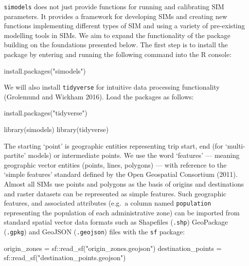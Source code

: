 \documentclass[11pt,letterpaper]{article}
\newenvironment{Shaded}{\begin{snugshade}}{\end{snugshade}}
\newcommand{\FunctionTok}[1]{\textcolor[rgb]{0.00,0.00,0.00}{#1}}
\newcommand{\NormalTok}[1]{#1}
\newcommand{\OtherTok}[1]{\textcolor[rgb]{0.56,0.35,0.01}{#1}}
\newcommand{\SpecialCharTok}[1]{\textcolor[rgb]{0.00,0.00,0.00}{#1}}
\newcommand{\StringTok}[1]{\textcolor[rgb]{0.31,0.60,0.02}{#1}}
\begin{document}
\texttt{simodels} does not just provide functions for running and calibrating SIM parameters.
It provides a framework for developing SIMs and creating new functions implementing different types of SIM and using a variety of pre-existing modelling tools in SIMs.
We aim to expand the functionality of the package building on the foundations presented below.
The first step is to install the package by entering and running the following command into the R console:

\begin{Shaded}
\begin{Highlighting}[]
\FunctionTok{install.packages}\NormalTok{(}\StringTok{"simodels"}\NormalTok{)}
\end{Highlighting}
\end{Shaded}

We will also install \texttt{tidyverse} for intuitive data processing functionality (Grolemund and Wickham 2016).
Load the packages as follows:

\begin{Shaded}
\begin{Highlighting}[]
\FunctionTok{install.packages}\NormalTok{(}\StringTok{"tidyverse"}\NormalTok{)}
\end{Highlighting}
\end{Shaded}

\begin{Shaded}
\begin{Highlighting}[]
\FunctionTok{library}\NormalTok{(simodels)}
\FunctionTok{library}\NormalTok{(tidyverse)}
\end{Highlighting}
\end{Shaded}

The starting `point' is geographic entities representing trip start, end (for `multi-partite' models) or intermediate points.
We use the word `features' --- meaning geographic vector entities (points, lines, polygons) --- with reference to the `simple features' standard defined by the Open Geospatial Consortium (2011).
Almost all SIMs use points and polygons as the basis of origins and destinations and raster datasets can be represented as simple features.
Such geographic features, and associated attributes (e.g.~a column named \texttt{population} representing the population of each administrative zone) can be imported from standard spatial vector data formats such as Shapefiles (\texttt{.shp}) GeoPackage (\texttt{.gpkg}) and GeoJSON (\texttt{.geojson}) files with the \texttt{sf} package:

\begin{Shaded}
\begin{Highlighting}[]
\NormalTok{origin\_zones }\OtherTok{=}\NormalTok{ sf}\SpecialCharTok{::}\FunctionTok{read\_sf}\NormalTok{(}\StringTok{"origin\_zones.geojson"}\NormalTok{)}
\NormalTok{destination\_points }\OtherTok{=}\NormalTok{ sf}\SpecialCharTok{::}\FunctionTok{read\_sf}\NormalTok{(}\StringTok{"destination\_points.geojson"}\NormalTok{)}
\end{Highlighting}
\end{Shaded}
\end{document}
